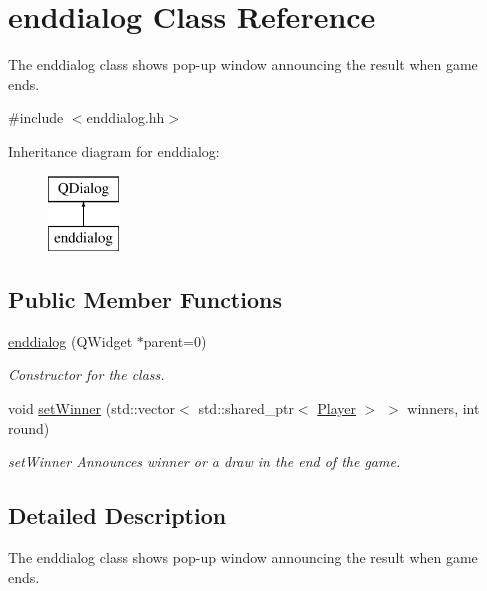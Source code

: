 \hypertarget{classenddialog}{\section{enddialog Class Reference}
\label{classenddialog}
}


The enddialog class shows pop-\/up window announcing the result when game ends.  




{\ttfamily \#include $<$enddialog.\-hh$>$}

Inheritance diagram for enddialog\-:\begin{figure}[H]
\begin{center}
\leavevmode
\includegraphics[height=2.000000cm]{classenddialog}
\end{center}
\end{figure}
\subsection*{Public Member Functions}
\begin{DoxyCompactItemize}
\item 
\hyperlink{classenddialog_a5dcbc64678b43043e16f74bd4c4dffb0}{enddialog} (Q\-Widget $\ast$parent=0)
\begin{DoxyCompactList}\small\item\em Constructor for the class. \end{DoxyCompactList}\item 
void \hyperlink{classenddialog_ab3da4bfad75f08deb94a5139799fcbb9}{set\-Winner} (std\-::vector$<$ std\-::shared\-\_\-ptr$<$ \hyperlink{classPlayer}{Player} $>$ $>$ winners, int round)
\begin{DoxyCompactList}\small\item\em set\-Winner Announces winner or a draw in the end of the game. \end{DoxyCompactList}\end{DoxyCompactItemize}


\subsection{Detailed Description}
The enddialog class shows pop-\/up window announcing the result when game ends. 


